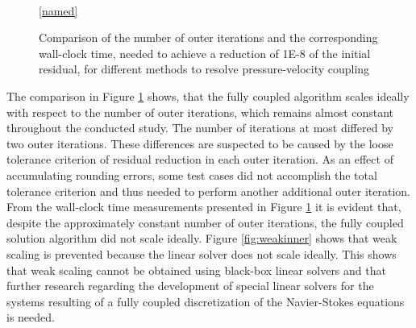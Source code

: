 \begin{figure}[h!]
  \begin{center}
    \\
  \ref{named}
  \end{center}
  \caption{Comparison of the number of outer iterations and the corresponding wall-clock time, needed to achieve a reduction of 1E-8 of the initial residual, for different methods to resolve pressure-velocity coupling}
  \label{fig:weak}
\end{figure}

The comparison in Figure \ref{fig:weak} shows, that the fully coupled algorithm scales ideally with respect to the number of outer iterations, which remains almost constant throughout the conducted study. The number of iterations at most differed by two outer iterations. These differences are suspected to be caused by the loose tolerance criterion of residual reduction in each outer iteration. As an effect of accumulating rounding errors, some test cases did not accomplish the total tolerance criterion and thus needed to perform another additional outer iteration. From the wall-clock time measurements presented in Figure \ref{fig:weak} it is evident that, despite the approximately constant number of outer iterations, the fully coupled solution algorithm did not scale ideally. Figure \ref{fig:weakinner} shows that weak scaling is prevented because the linear solver does not scale ideally. This shows that weak scaling cannot be obtained using black-box linear solvers and that further research regarding the development of special linear solvers for the systems resulting of a fully coupled discretization of the Navier-Stokes equations is needed.

